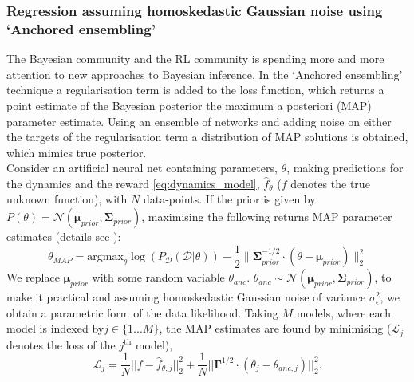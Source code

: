 \documentclass[
reprint,
amsmath,amssymb,amsfonts,clevref,
aps,
prstab,
]{revtex4-2}
\begin{document}
	\subsubsection{Regression assuming homoskedastic Gaussian noise using `Anchored ensembling'}
	The Bayesian community and the RL community is spending more and more attention to
	new approaches to Bayesian inference. In the `Anchored ensembling' technique a regularisation
	term is added to the loss function, which returns a point estimate of
	the Bayesian posterior the maximum a posteriori (MAP) parameter estimate. 
	Using an ensemble of networks and adding noise on either the targets of the regularisation term a distribution of MAP solutions  \cite{Gu2007, Chen2011, Bardsley2012, Pearce2018} is obtained, which mimics true posterior.\\
	Consider an artificial neural net containing parameters, ${\theta}$, making predictions for the dynamics and the reward \cref{eq:dynamics_model}, $\hat{f}_\theta$ ($f$ denotes the true unknown function), with $N$ data-points. If the prior is given by $P(\theta) = \mathcal{N}(\pmb{\mu}_{prior}, \pmb{\Sigma}_{prior})$, maximising the following returns MAP parameter estimates (details see \cite{Pearce2018}):
	\begin{equation}
		\label{eq_MAP_loglike_anc}
		{\theta}_{MAP}  = \text{argmax}_{{\theta}} \log( P_{\mathcal{D}}( \mathcal{D} | {\theta} ) ) - 
		\frac{1}{2} 
		\lVert \pmb{\Sigma}_{prior}^{-1/2} \cdot
		({\theta} - \pmb{\mu}_{prior}) \rVert^2_2
	\end{equation}
	We replace $\pmb{\mu}_{prior}$ with some random variable $ {\theta}_{anc}$.
	${\theta}_{anc} \sim \mathcal{N}(\pmb{\mu}_{prior},\pmb{\Sigma}_{prior} )$, to make it practical and
	assuming homoskedastic Gaussian noise of variance $\sigma^2_\epsilon$, we obtain a parametric form of the data likelihood. Taking $M$ models, where each model is indexed by$j \in \{1 ... M\}$, the MAP estimates are found by minimising ($\mathcal L_{j}$ denotes the loss of the $j^\text{th}$ model),
	\begin{equation}
		\label{eqn_anch_loss_matrix}
		\mathcal L_{j} =  
		\frac{1}{N} \lvert \lvert f - \hat{f}_{\theta, j} \rvert \rvert ^2_2
		+ \frac{1}{N} \lvert \lvert \pmb{\Gamma}^{1/2} \cdot (\theta_j - \theta_{anc,j}) \rvert \rvert ^2_2.
	\end{equation}
\end{document}
